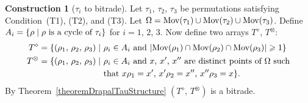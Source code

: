 \documentclass[amstags,fleqn,reqno]{article}
\theoremstyle{plain}
\theoremstyle{definition}
\newtheorem{construction}[theorem]{Construction}
\renewcommand\geq{\geqslant}
\newcommand{\Tidentity}{\textnormal{(T1)}\xspace}
\newcommand{\Tcycledisjoint}{\textnormal{(T2)}\xspace}
\newcommand{\Tfpf}{\textnormal{(T3)}\xspace}
\newcommand{\darts}{\Omega\xspace}
\newcommand{\opa}{\diamond}
\newcommand{\opb}{\otimes}
\newcommand{\mov}{\textnormal{Mov}}
\begin{document}
\begin{construction}[$\tau_i$ to bitrade]\label{constructionTauToBitrade}
Let $\tau_1$, $\tau_2$, $\tau_3$ be permutations satisfying
Condition~\Tidentity, \Tcycledisjoint, and \Tfpf.
Let $\darts = \mov(\tau_1) \cup \mov(\tau_2) \cup \mov(\tau_3)$.  
Define $A_i = \{ \rho \mid \textnormal{$\rho$ is a cycle of $\tau_i$} \}$
for $i = 1$, $2$, $3$. Now define two arrays
$T^{\opa}$, $T^{\opb}$: 
\begin{align*}
T^{\opa}= \{( {\rho}_1,\, {\rho}_2,\, {\rho}_3 )\mid 
&\text{ $\rho_i \in A_i$ and 
$\left| \mov(\rho_1) \cap \mov(\rho_2) \cap \mov(\rho_3) \right| \geq
1$} \} \\
T^{\opb} = \{( {\rho}_1,\, {\rho}_2,\, {\rho}_3 ) \mid
&\text{ $\rho_i \in A_i$ and $x$, $x'$, $x''$ are distinct points of
$\darts$ such} \\
&\text{ that $x\rho_1=x'$, $x'\rho_2=x''$, $x''\rho_3=x$} \}. 
\end{align*}
By Theorem~\ref{theoremDrapalTauStructure} $(T^{\opa},\, T^{\opb})$ 
is a bitrade.
\end{construction}
\end{document}
